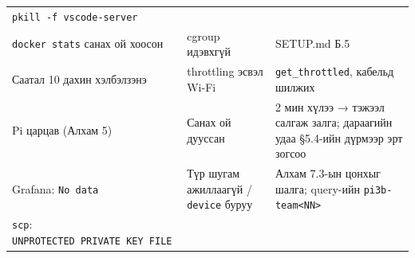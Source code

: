 \begin{longtable}[]{@{}lll@{}}
\begin{minipage}[t]{0.30\columnwidth}
\texttt{pkill\ -f\ vscode-server}\strut
\end{minipage}\tabularnewline
\begin{minipage}[t]{0.30\columnwidth}\raggedright
\texttt{docker\ stats} санах ой хоосон\strut
\end{minipage} & \begin{minipage}[t]{0.30\columnwidth}\raggedright
cgroup идэвхгүй\strut
\end{minipage} & \begin{minipage}[t]{0.30\columnwidth}\raggedright
SETUP.md Б.5\strut
\end{minipage}\tabularnewline
\begin{minipage}[t]{0.30\columnwidth}\raggedright
Саатал 10 дахин хэлбэлзэнэ\strut
\end{minipage} & \begin{minipage}[t]{0.30\columnwidth}\raggedright
throttling эсвэл Wi-Fi\strut
\end{minipage} & \begin{minipage}[t]{0.30\columnwidth}\raggedright
\texttt{get\_throttled}, кабельд шилжих\strut
\end{minipage}\tabularnewline
\begin{minipage}[t]{0.30\columnwidth}\raggedright
Pi царцав (Алхам 5)\strut
\end{minipage} & \begin{minipage}[t]{0.30\columnwidth}\raggedright
Санах ой дууссан\strut
\end{minipage} & \begin{minipage}[t]{0.30\columnwidth}\raggedright
2 мин хүлээ → тэжээл салгаж залга; дараагийн удаа §5.4-ийн дүрмээр эрт зогсоо\strut
\end{minipage}\tabularnewline
\begin{minipage}[t]{0.30\columnwidth}\raggedright
Grafana: \texttt{No\ data}\strut
\end{minipage} & \begin{minipage}[t]{0.30\columnwidth}\raggedright
Түр шугам ажиллаагүй / \texttt{device} буруу\strut
\end{minipage} & \begin{minipage}[t]{0.30\columnwidth}\raggedright
Алхам 7.3-ын цонхыг шалга; query-ийн \texttt{pi3b-team\textless{}NN\textgreater{}}\strut
\end{minipage}\tabularnewline
\begin{minipage}[t]{0.30\columnwidth}\raggedright
\texttt{scp}: \texttt{UNPROTECTED\ PRIVATE\ KEY\ FILE}\strut
\end{minipage} & \begin{minipage}[t]{0.30\columnwidth}\raggedright

\end{minipage}
\end{longtable}
